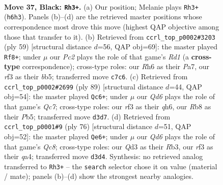 \documentclass[11pt]{article}
\begin{document}
\clearpage

\begin{figure}[p]\centering
\begin{subfigure}{0.46\textwidth}\centering
\resizebox{\linewidth}{!}{%
\newchessgame
\chessboard[
  setfen={1r4k1/2p2p2/7r/2Q5/2P1P1P1/3q1RK1/8/1N6 b - - 1 37},
  showmover=false,
  pgfstyle=straightmove, color=movearrow, markmove={h6-h3}
]}
\caption{}
\end{subfigure}\hfill
\begin{subfigure}{0.46\textwidth}\centering
\resizebox{\linewidth}{!}{%
\newchessgame
\chessboard[
  setfen={1k1r4/p7/4p2r/1Bq1P1p1/8/4Q3/1P3KP1/R2R4 b - - 1 30},
  showmover=false,
  pgfstyle=straightmove, color=movearrow, markmove={d8-f8}
]}
\caption{}
\end{subfigure}
\\[4pt]
\begin{subfigure}{0.46\textwidth}\centering
\resizebox{\linewidth}{!}{%
\newchessgame
\chessboard[
  setfen={6k1/5p2/3p3Q/1p4r1/8/1P4P1/P1q2RKP/8 b - - 8 45},
  showmover=false,
  pgfstyle=straightmove, color=movearrow, markmove={c2-c6}
]}
\caption{}
\end{subfigure}\hfill
\begin{subfigure}{0.46\textwidth}\centering
\resizebox{\linewidth}{!}{%
\newchessgame
\chessboard[
  setfen={2Q2rk1/1p4r1/5p2/p2P4/q7/1R6/6PK/5R2 w - - 4 39},
  showmover=false,
  pgfstyle=straightmove, color=movearrow, markmove={c8-e6}
]}
\caption{}
\end{subfigure}
\caption{\textbf{Move 37, Black: \texttt{Rh3+}.} (a) Our position; Melanie plays \texttt{Rh3+} (\texttt{h6h3}). Panels (b)--(d) are the retrieved master positions whose correspondence most drove this move (highest QAP objective among those that transfer to it). (b) Retrieved from \texttt{ccrl\_top\_p0002\#3203} (ply 59) [structural distance $d$=56, QAP obj=69]: the master played \texttt{Rf8+}; under $\mu$ our \emph{Pc2} plays the role of that game's \emph{Rd1} (a \textbf{cross-type} correspondence); cross-type roles: our \emph{R}h6 as their \emph{P}a7, our \emph{r}f3 as their \emph{b}b5; transferred move \texttt{c7c6}. (c) Retrieved from \texttt{ccrl\_top\_p0002\#2699} (ply 89) [structural distance $d$=44, QAP obj=54]: the master played \texttt{Qc6+}; under $\mu$ our \emph{Qd6} plays the role of that game's \emph{Qc7}; cross-type roles: our \emph{r}f3 as their \emph{q}h6, our \emph{R}b8 as their \emph{P}b5; transferred move \texttt{d3d7}. (d) Retrieved from \texttt{ccrl\_top\_p0001\#9} (ply 76) [structural distance $d$=51, QAP obj=52]: the master played \texttt{Qe6+}; under $\mu$ our \emph{Qd6} plays the role of that game's \emph{Qc8}; cross-type roles: our \emph{Q}d3 as their \emph{R}b3, our \emph{r}f3 as their \emph{q}a4; transferred move \texttt{d3d4}. Synthesis: no retrieved analog transferred to \texttt{Rh3+} -- the \texttt{search} selector chose it on value (material / mate); panels (b)--(d) show the strongest nearby analogies.}
\label{fig:thought-m73}
\end{figure}
\end{document}
